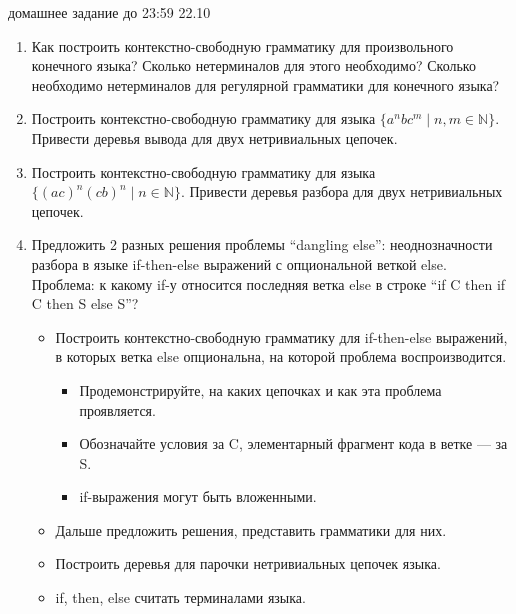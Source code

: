 \documentclass[12pt]{article}
\begin{document}

{\Large домашнее задание до 23:59 22.10}
\bigskip

\begin{enumerate}
  \item 
  {
    Как построить контекстно-свободную грамматику для произвольного конечного языка? Сколько нетерминалов для этого необходимо? Сколько необходимо нетерминалов для регулярной грамматики для конечного языка?
  }
  \item 
  {  
    Построить контекстно-свободную грамматику для языка $\{a^n b c^m \mid n, m \in \mathbb{N}\}$. Привести деревья вывода для двух нетривиальных цепочек.
  }
  \item
  { 
    Построить контекстно-свободную грамматику для языка $\{ (ac)^n (cb)^n \mid n \in \mathbb{N}\}$. Привести деревья разбора для двух нетривиальных цепочек. 
  }
  \item 
  { 
    Предложить 2 разных решения проблемы ``dangling else'': неоднозначности разбора в языке if-then-else выражений с опциональной веткой else. Проблема: к какому if-у относится последняя ветка else в строке ``if C then if C then S else S''? 
    \begin{itemize}
      \item 
      {
        Построить контекстно-свободную грамматику для if-then-else выражений, в которых ветка else опциональна, на которой проблема воспроизводится. 
        \begin{itemize} 
          \item { Продемонстрируйте, на каких цепочках и как эта проблема проявляется. }
          \item { Обозначайте условия за C, элементарный фрагмент кода в ветке --- за S. }
          \item { if-выражения могут быть вложенными. }
        \end{itemize}
      }
      \item 
      {
        Дальше предложить решения, представить грамматики для них. 
      }
      \item
      {
        Построить деревья для парочки нетривиальных цепочек языка.
      }
      \item 
      {
        if, then, else считать терминалами языка. 
      }
    \end{itemize}
  }
    
\end{enumerate}

\end{document}
